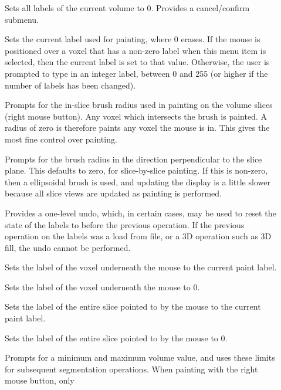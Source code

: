 \begin{description}
\item[]  Sets all labels of the
         current volume to 0.   Provides a cancel/confirm submenu.
\item[]  Sets the current label
    used for painting, where 0 erases.  If the mouse is positioned over
    a voxel that has a non-zero label when this menu item is selected, then
    the current label is set to that value.  Otherwise, the user is prompted
    to type in an integer label, between 0 and 255 (or higher if the number
    of labels has been changed).
\item[]  Prompts for the in-slice 
    brush radius used in painting on the volume slices (right mouse button).
    Any voxel which intersects the brush is painted.
    A radius of zero is therefore paints any voxel the mouse is in.
    This gives the most fine control over painting.
\item[]  Prompts for the brush
    radius in the direction perpendicular to the slice plane.  This
    defaults to zero, for slice-by-slice painting.  If this is non-zero, then
    a ellipsoidal brush is used, and updating the display is a little
    slower because all slice views are updated as painting is performed.
\item[]  Provides a one-level undo, which, in certain
    cases, may be used to reset the state of the labels to before the
    previous operation.  If the previous operation on the labels was a load
    from file, or a 3D operation such as 3D fill, the undo cannot be performed.
\item[]  Sets the label of the voxel
    underneath the mouse to the current paint label.
\item[]  Sets the label of the voxel
    underneath the mouse to 0.
\item[]  Sets the label of the 
    entire slice pointed to by the mouse to the current paint label.
\item[]  Sets the label of the 
    entire slice pointed to by the mouse to 0.
\item[]  Prompts for a minimum and
    maximum volume val\-ue, and uses these limits for subsequent segmentation
    operations.  When painting with the right mouse button, only

\end{description}
